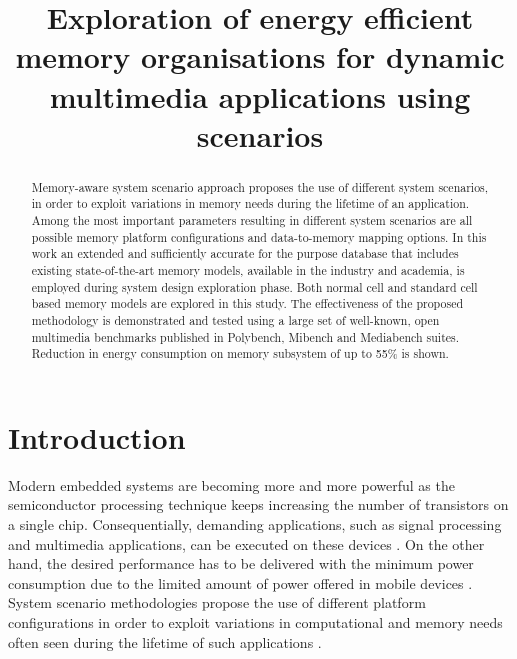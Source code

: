 \documentclass[a4paper,conference]{IEEEtran}
\begin{document}
\title{Exploration of energy efficient memory organisations for dynamic multimedia applications using scenarios}
\author{
}

\maketitle


\begin{abstract}
Memory-aware system scenario approach proposes the use of different system scenarios, in order to exploit variations in memory needs during the lifetime of an application. Among the most important parameters resulting in different system scenarios are all possible memory platform configurations and data-to-memory mapping options. In this work an extended and sufficiently accurate for the purpose database that includes existing state-of-the-art memory models, available in the industry and academia, is employed during system design exploration phase. Both normal cell and standard cell based memory models are explored in this study. The effectiveness of the proposed methodology is demonstrated and tested using a large set of well-known, open multimedia benchmarks published in Polybench, Mibench and Mediabench suites. Reduction in energy consumption on memory subsystem of up to 55\% is shown.
\end{abstract}
\IEEEpeerreviewmaketitle

\section{Introduction}
\label{sec:introduction}

Modern embedded systems are becoming more and more powerful as the semiconductor processing technique keeps increasing the number of transistors on a single chip. Consequentially, demanding applications, such as signal processing and multimedia applications, can be executed on these devices \cite{narasinga}. On the other hand, the desired performance has to be delivered with the minimum power consumption due to the limited amount of power offered in mobile devices \cite{tcm}. System scenario methodologies propose the use of different platform configurations in order to exploit variations in computational and memory needs often seen during the lifetime of such applications \cite{tcm}. 
\end{document}
